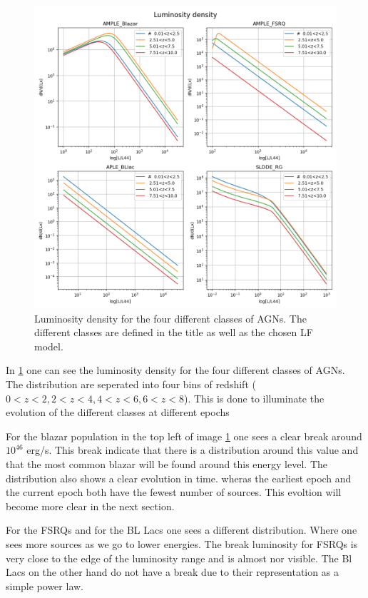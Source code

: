 \documentclass{article}
\begin{document}
\begin{figure}
    \centering
    \includegraphics[width = \textwidth]{Luminosirt density.png}
    \caption{Luminosity density for the four different classes of AGNs. The different classes are defined in the title as well as the chosen LF model.}
    \label{fig:LD}
\end{figure}

In \ref{fig:LD} one can see the luminosity density for the four different classes of AGNs. The distribution are 
seperated into four bins of redshift ($0<z<2,2<z<4,4<z<6,6<z<8$). This is done to illuminate the evolution of the different classes at different 
epochs

For the blazar population in the top left of image \ref{fig:LD} one sees a clear break around $10^{46}$ erg/s. This break indicate that there is a distribution
around this value and that the most common blazar will be found around this energy level. The distribution also shows a clear evolution in time. wheras the earliest epoch
and the current epoch both have the fewest number of sources. This evoltion will become more clear in the next section.

For the FSRQs and for the BL Lacs one sees a different distribution. Where one sees more sources as we go to lower energies. The break luminosity for FSRQs 
is very close to the edge of the luminosity range and is almost nor visible. The Bl Lacs on the other hand do not have a break 
due to their representation as a simple power law.  
\end{document}
